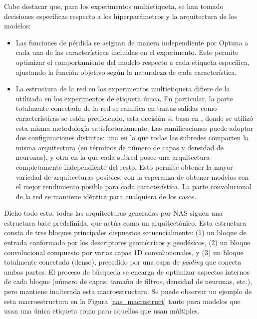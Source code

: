 Cabe destacar que, para los experimentos multietiqueta, se han tomado decisiones específicas respecto a los hiperparámetros y la arquitectura de los modelos:

\begin{itemize}
    \item Las funciones de pérdida se asignan de manera independiente por Optuna a cada una de las características incluidas en el experimento. Esto permite optimizar el comportamiento del modelo respecto a cada etiqueta específica, ajustando la función objetivo según la naturaleza de cada característica.
    
    \item La estructura de la red en los experimentos multietiqueta difiere de la utilizada en los experimentos de etiqueta única. En particular, la parte totalmente conectada de la red se ramifica en tantas salidas como características se estén prediciendo, esta decisión se basa en \cite{ranjan_hyperface_2019}, donde se utilizó esta misma metodología satisfactoriamente. Las ramificaciones puede adoptar dos configuraciones distintas: una en la que todas las subredes comparten la misma arquitectura (en términos de número de capas y densidad de neuronas), y otra en la que cada subred posee una arquitectura completamente independiente del resto. Esto permite obtener la mayor variedad de arquitecturas posibles, con la esperanza de obtener modelos con el mejor rendimiento posible para cada característica. La parte convolucional de la red se mantiene idéntica para cualquiera de los casos.
\end{itemize}

Dicho todo esto, todas las arquitecturas generadas por NAS siguen una estructura base predefinida, que actúa como un  arquitectónico. Esta estructura consta de tres bloques principales dispuestos secuencialmente: (1) un bloque de entrada conformado por los descriptores geométricos y geodésicos, (2) un bloque convolucional compuesto por varias capas 1D convolucionales, y (3) un bloque totalmente conectado (denso), precedido por una capa de \textit{pooling} que conecta ambas partes. El proceso de búsqueda se encarga de optimizar aspectos internos de cada bloque (número de capas, tamaño de filtros, densidad de neuronas, etc.), pero mantiene inalterada esta macroestructura. Se puede observar un ejemplo de esta macroestructura en la Figura \ref{nas_macrostruct} tanto para modelos que usan una única etiqueta como para aquellos que usan múltiples.

